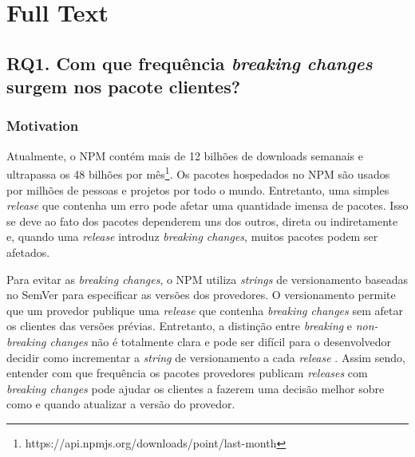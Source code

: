 \chapter{Full Text}

\section{RQ1. Com que frequência \textit{breaking changes} surgem nos pacote clientes?}
\label{sec:rq1}

\subsection{Motivation}
\label{mot:rq1}

Atualmente, o \Gls{NPM} contém mais de 12 bilhões de downloads semanais e ultrapassa os 48 bilhões por mês\footnote{https://api.npmjs.org/downloads/point/last-month}. Os pacotes hospedados no \Gls{NPM} são usados por milhões de pessoas e projetos por todo o mundo. Entretanto, uma simples \textit{release} que contenha um erro pode afetar uma quantidade imensa de pacotes. Isso se deve ao fato dos pacotes dependerem uns dos outros, direta ou indiretamente e, quando uma \textit{release} introduz \textit{breaking changes}, muitos pacotes podem ser afetados.

Para evitar as \textit{breaking changes}, o \Gls{NPM} utiliza \textit{strings} de versionamento baseadas no \Gls{SemVer} para especificar as versões dos provedores. O versionamento permite que um provedor publique uma \textit{release} que contenha \textit{breaking changes} sem afetar os clientes das versões prévias. Entretanto, a distinção entre \textit{breaking} e \textit{non-breaking changes} não é totalmente clara e pode ser difícil para o desenvolvedor decidir como incrementar a \textit{string} de versionamento a cada \textit{release} \cite{noregrets2018}. Assim sendo, entender com que frequência os pacotes provedores publicam \textit{releases} com \textit{breaking changes} pode ajudar os clientes a fazerem uma decisão melhor sobre como e quando atualizar a versão do provedor.

